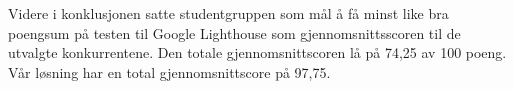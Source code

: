 Videre i konklusjonen satte studentgruppen som mål å få minst like bra poengsum på testen til Google Lighthouse som gjennomsnittsscoren til de utvalgte konkurrentene. Den totale gjennomsnittscoren lå på 74,25 av 100 poeng. Vår løsning har en total gjennomsnittscore på 97,75.






